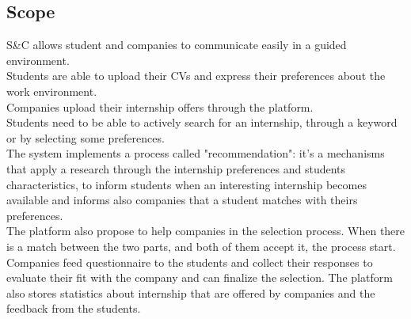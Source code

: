 \subsection{Scope}
S\&C allows student and companies to communicate easily in a guided environment.\\
Students are able to upload their CVs and express their preferences about the work environment.\\
Companies upload their internship offers through the platform.\\
Students need to be able to actively search for an internship, through a keyword or by selecting some preferences.\\
The system  implements a process called "recommendation": it's a mechanisms that apply a research through the internship preferences and students characteristics, to inform students when an interesting internship becomes available and informs also companies that a student matches with theirs preferences.\\
The platform also propose to help companies in the selection process. When there is a match between the two parts, and both of them accept it, the process start. Companies feed questionnaire to the students and collect their responses to evaluate their fit with the company and can finalize the selection. 
The platform also stores statistics about internship that are offered by companies and the feedback from the students.
